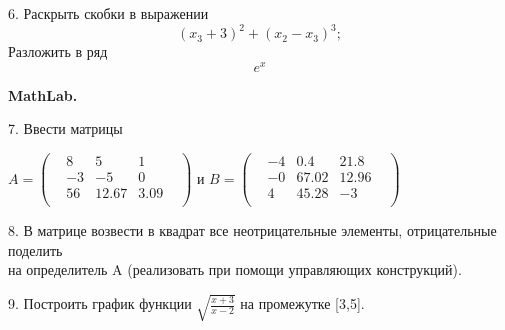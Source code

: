 \documentclass[11pt]{article}
\begin{document}
6. Раскрыть скобки в выражении\\ 	
\begin {equation*}
	{(x_3+3)}^2+{(x_2-x_3)^3};
\end {equation*}
Разложить в ряд $$e^x$$

\begin{center}\bf MathLab. \rm\end{center}

7. Ввести матрицы\\
\begin {center}
$ A =
\begin{pmatrix} 
& 8 & 5 & 1 &\\
& -3 & -5 & 0 &\\
& 56 & 12.67 & 3.09 &\\
\end{pmatrix}
$
и
$ B =
\begin{pmatrix} 
& -4 & 0.4 & 21.8 &\\
& -0 & 67.02 & 12.96 &\\
& 4 & 45.28 & -3 &\\
\end{pmatrix}
$
\end {center}

8. В матрице возвести в квадрат все неотрицательные элементы, отрицательные поделить\\ на определитель A (реализовать при помощи управляющих конструкций).

9. Построить график функции $ \sqrt{\frac{x+3}{x-2}} $ на промежутке [3,5].
\end{document}
